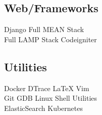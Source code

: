 \documentclass[]{deedy-resume-openfont}
\begin{document}
\begin{minipage}[t]{0.30\textwidth}
\subsection{Web/Frameworks}
Django \textbullet{} Full MEAN Stack \\
Full LAMP Stack \textbullet{} Codeigniter \\
\vspace{0.4 cm}
\subsection{Utilities}
Docker \textbullet{} DTrace \textbullet{} \LaTeX{} \textbullet{} Vim \\
Git \textbullet{} GDB \textbullet{} Linux Shell Utilities \\
ElasticSearch \textbullet{} Kubernetes \\


%
%

\end{minipage}
\hfill
\end{document}
